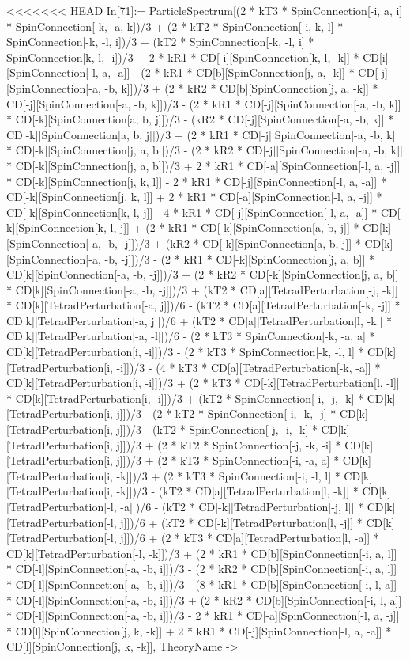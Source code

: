 <<<<<<< HEAD
In[71]:= ParticleSpectrum[(2 * kT3 * SpinConnection[-i, a, i] * SpinConnection[-k, -a, k])/3 + (2 * kT2 * SpinConnection[-i, k, l] * SpinConnection[-k, -l, i])/3 + (kT2 * SpinConnection[-k, -l, i] * SpinConnection[k, l, -i])/3 + 2 * kR1 * CD[-i][SpinConnection[k, l, -k]] * CD[i][SpinConnection[-l, a, -a]] - (2 * kR1 * CD[b][SpinConnection[j, a, -k]] * CD[-j][SpinConnection[-a, -b, k]])/3 + (2 * kR2 * CD[b][SpinConnection[j, a, -k]] * CD[-j][SpinConnection[-a, -b, k]])/3 - (2 * kR1 * CD[-j][SpinConnection[-a, -b, k]] * CD[-k][SpinConnection[a, b, j]])/3 - (kR2 * CD[-j][SpinConnection[-a, -b, k]] * CD[-k][SpinConnection[a, b, j]])/3 + (2 * kR1 * CD[-j][SpinConnection[-a, -b, k]] * CD[-k][SpinConnection[j, a, b]])/3 - (2 * kR2 * CD[-j][SpinConnection[-a, -b, k]] * CD[-k][SpinConnection[j, a, b]])/3 + 2 * kR1 * CD[-a][SpinConnection[-l, a, -j]] * CD[-k][SpinConnection[j, k, l]] - 2 * kR1 * CD[-j][SpinConnection[-l, a, -a]] * CD[-k][SpinConnection[j, k, l]] + 2 * kR1 * CD[-a][SpinConnection[-l, a, -j]] * CD[-k][SpinConnection[k, l, j]] - 4 * kR1 * CD[-j][SpinConnection[-l, a, -a]] * CD[-k][SpinConnection[k, l, j]] + (2 * kR1 * CD[-k][SpinConnection[a, b, j]] * CD[k][SpinConnection[-a, -b, -j]])/3 + (kR2 * CD[-k][SpinConnection[a, b, j]] * CD[k][SpinConnection[-a, -b, -j]])/3 - (2 * kR1 * CD[-k][SpinConnection[j, a, b]] * CD[k][SpinConnection[-a, -b, -j]])/3 + (2 * kR2 * CD[-k][SpinConnection[j, a, b]] * CD[k][SpinConnection[-a, -b, -j]])/3 + (kT2 * CD[a][TetradPerturbation[-j, -k]] * CD[k][TetradPerturbation[-a, j]])/6 - (kT2 * CD[a][TetradPerturbation[-k, -j]] * CD[k][TetradPerturbation[-a, j]])/6 + (kT2 * CD[a][TetradPerturbation[l, -k]] * CD[k][TetradPerturbation[-a, -l]])/6 - (2 * kT3 * SpinConnection[-k, -a, a] * CD[k][TetradPerturbation[i, -i]])/3 - (2 * kT3 * SpinConnection[-k, -l, l] * CD[k][TetradPerturbation[i, -i]])/3 - (4 * kT3 * CD[a][TetradPerturbation[-k, -a]] * CD[k][TetradPerturbation[i, -i]])/3 + (2 * kT3 * CD[-k][TetradPerturbation[l, -l]] * CD[k][TetradPerturbation[i, -i]])/3 + (kT2 * SpinConnection[-i, -j, -k] * CD[k][TetradPerturbation[i, j]])/3 - (2 * kT2 * SpinConnection[-i, -k, -j] * CD[k][TetradPerturbation[i, j]])/3 - (kT2 * SpinConnection[-j, -i, -k] * CD[k][TetradPerturbation[i, j]])/3 + (2 * kT2 * SpinConnection[-j, -k, -i] * CD[k][TetradPerturbation[i, j]])/3 + (2 * kT3 * SpinConnection[-i, -a, a] * CD[k][TetradPerturbation[i, -k]])/3 + (2 * kT3 * SpinConnection[-i, -l, l] * CD[k][TetradPerturbation[i, -k]])/3 - (kT2 * CD[a][TetradPerturbation[l, -k]] * CD[k][TetradPerturbation[-l, -a]])/6 - (kT2 * CD[-k][TetradPerturbation[-j, l]] * CD[k][TetradPerturbation[-l, j]])/6 + (kT2 * CD[-k][TetradPerturbation[l, -j]] * CD[k][TetradPerturbation[-l, j]])/6 + (2 * kT3 * CD[a][TetradPerturbation[l, -a]] * CD[k][TetradPerturbation[-l, -k]])/3 + (2 * kR1 * CD[b][SpinConnection[-i, a, l]] * CD[-l][SpinConnection[-a, -b, i]])/3 - (2 * kR2 * CD[b][SpinConnection[-i, a, l]] * CD[-l][SpinConnection[-a, -b, i]])/3 - (8 * kR1 * CD[b][SpinConnection[-i, l, a]] * CD[-l][SpinConnection[-a, -b, i]])/3 + (2 * kR2 * CD[b][SpinConnection[-i, l, a]] * CD[-l][SpinConnection[-a, -b, i]])/3 - 2 * kR1 * CD[-a][SpinConnection[-l, a, -j]] * CD[l][SpinConnection[j, k, -k]] + 2 * kR1 * CD[-j][SpinConnection[-l, a, -a]] * CD[l][SpinConnection[j, k, -k]], TheoryName -> 